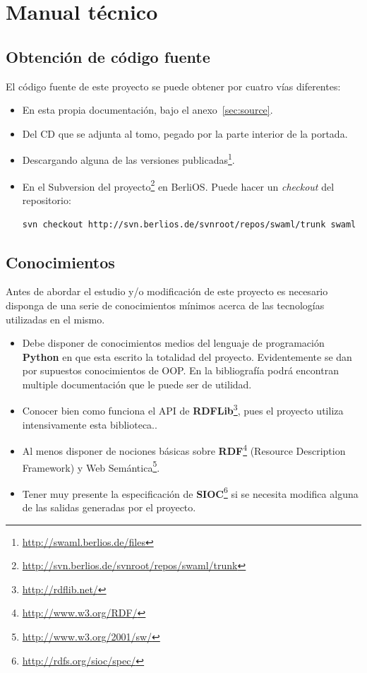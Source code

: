 
\section{Manual técnico}

\subsection*{Obtención de código fuente}

El código fuente de este proyecto se puede obtener por cuatro vías diferentes:

\begin{itemize}
  \item En esta propia documentación, bajo el anexo~\ref{sec:source}.
  \item Del CD que se adjunta al tomo, pegado por la parte interior
	de la portada.
  \item Descargando alguna de las versiones
	publicadas\footnote{\url{http://swaml.berlios.de/files}}.
  \item En el Subversion del proyecto\footnote{\url{http://svn.berlios.de/svnroot/repos/swaml/trunk}} 
	en BerliOS. Puede hacer un \emph{checkout} del repositorio:
	\begin{center}
	 \texttt{svn checkout http://svn.berlios.de/svnroot/repos/swaml/trunk swaml}
	\end{center}
\end{itemize}

\subsection*{Conocimientos}

Antes de abordar el estudio y/o modificación de este proyecto es necesario 
disponga de una serie de conocimientos mínimos acerca de las tecnologías
utilizadas en el mismo.

\begin{itemize}
  \item Debe disponer de conocimientos medios del lenguaje de programación 
	\textbf{Python} en que esta escrito la totalidad del proyecto. 
	Evidentemente se dan por supuestos conocimientos de OOP. En la
	bibliografía podrá encontran multiple documentación que le puede ser
	de utilidad.
  \item Conocer bien como funciona el API de 
	\textbf{RDFLib}\footnote{\url{http://rdflib.net/}}, pues el proyecto
	utiliza intensivamente esta biblioteca..
  \item Al menos disponer de nociones básicas sobre 
	\textbf{RDF}\footnote{\url{http://www.w3.org/RDF/}} (Resource Description 
	Framework) y Web Semántica\footnote{\url{http://www.w3.org/2001/sw/}}.
  \item Tener muy presente la especificación de 
	\textbf{SIOC}\footnote{\url{http://rdfs.org/sioc/spec/}} si se necesita
	modifica alguna de las salidas generadas por el proyecto.
\end{itemize}

